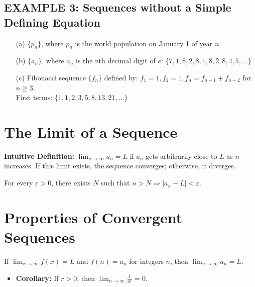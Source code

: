 \documentclass{article}
\begin{document}
\subsection*{EXAMPLE 3: Sequences without a Simple Defining Equation}
\begin{itemize}
    \item[(a)] \(\{p_n\}\), where \(p_n\) is the world population on January 1 of year \(n\).
    \item[(b)] \(\{a_n\}\), where \(a_n\) is the nth decimal digit of \(e\): \(\{7,1,8,2,8,1,8,2,8,4,5,\dots\}\)
    \item[(c)] Fibonacci sequence \(\{f_n\}\) defined by: \(f_1 = 1, f_2 = 1, f_n = f_{n-1} + f_{n-2}\) for \(n \geq 3\). \\
    First terms: \(\{1, 1, 2, 3, 5, 8, 13, 21, \dots\}\)
\end{itemize}

\section*{The Limit of a Sequence}
\textbf{Intuitive Definition:} \( \lim_{n\to\infty} a_n = L \) if \(a_n\) gets arbitrarily close to \(L\) as \(n\) increases. If this limit exists, the sequence converges; otherwise, it diverges.

\begin{tcolorbox}[colback=white, colframe=orange!80!white, title=Precise Definition of a Limit, boxrule=0.5mm, arc=3mm]
For every \( \varepsilon > 0 \), there exists \(N\) such that \( n > N \Rightarrow |a_n - L| < \varepsilon \).
\end{tcolorbox}

\section*{Properties of Convergent Sequences}
\begin{tcolorbox}[colback=white, colframe=orange!80!white, title=Theorem, boxrule=0.5mm, arc=3mm]
If \( \lim_{x\to\infty} f(x) = L \) and \(f(n) = a_n\) for integers \(n\), then \( \lim_{n\to\infty} a_n = L \).
\begin{itemize}
    \item \textbf{Corollary:} If \(r > 0\), then \( \lim_{n\to\infty} \frac{1}{n^r} = 0 \).
\end{itemize}
\end{tcolorbox}
\end{document}
